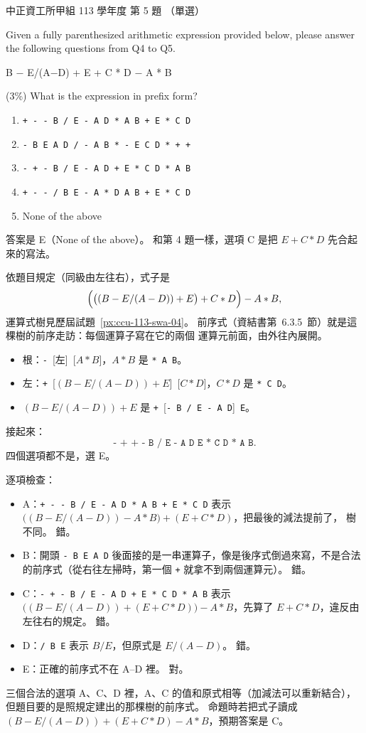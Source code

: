 \begin{pastexam}[label={px:ccu-113-swa-05}]{中正資工所甲組 113 學年度 第 5 題}
（單選）

Given a fully parenthesized arithmetic expression provided below, please answer the following questions from Q4 to Q5.
\begin{center}
B $-$ E/(A$-$D) + E + C * D $-$ A * B
\end{center}

(3\%) What is the expression in prefix form?
\begin{enumerate}[label=\Alph*.]
\item \texttt{+ - - B / E - A D * A B + E * C D}
\item \texttt{- B E A D / - A B * - E C D * + +}
\item \texttt{- + - B / E - A D + E * C D * A B}
\item \texttt{+ - - / B E - A * D A B + E * C D}
\item None of the above
\end{enumerate}
\end{pastexam}

\begin{pastsoln}
答案是 E（None of the above）。 和第 4 題一樣，選項 C 是把 $E + C * D$ 先合起來的寫法。

依題目規定（同級由左往右），式子是
\[
\Bigl( \bigl( (B - E/(A - D)) + E \bigr) + C * D \Bigr) - A * B ,
\]
運算式樹見歷屆試題~\ref{px:ccu-113-swa-04}。 前序式（資結書第~6.3.5~節）就是這棵樹的前序走訪：每個運算子寫在它的兩個
運算元前面，由外往內展開。
\begin{itemize}
\item 根：\texttt{-}\ [左]\ [$A * B$]，$A * B$ 是 \texttt{* A B}。
\item 左：\texttt{+}\ [$(B - E/(A-D)) + E$]\ [$C * D$]，$C * D$ 是 \texttt{* C D}。
\item $(B - E/(A-D)) + E$ 是 \texttt{+}\ [\texttt{- B / E - A D}]\ \texttt{E}。
\end{itemize}
接起來：
\[
\texttt{- + + - B / E - A D E * C D * A B}.
\]
四個選項都不是，選 E。

逐項檢查：
\begin{itemize}
\item A：\texttt{+ - - B / E - A D * A B + E * C D} 表示 $\bigl((B - E/(A-D)) - A * B\bigr) + (E + C * D)$，把最後的減法提前了，
樹不同。 錯。
\item B：開頭 \texttt{- B E A D} 後面接的是一串運算子，像是後序式倒過來寫，不是合法的前序式（從右往左掃時，第一個
\texttt{+} 就拿不到兩個運算元）。 錯。
\item C：\texttt{- + - B / E - A D + E * C D * A B} 表示 $\bigl((B - E/(A-D)) + (E + C * D)\bigr) - A * B$，先算了
$E + C * D$，違反由左往右的規定。 錯。
\item D：\texttt{/ B E} 表示 $B / E$，但原式是 $E / (A - D)$。 錯。
\item E：正確的前序式不在 A--D 裡。 對。
\end{itemize}
三個合法的選項 A、C、D 裡，A、C 的值和原式相等（加減法可以重新結合），但題目要的是照規定建出的那棵樹的前序式。
命題時若把式子讀成 $(B - E/(A - D)) + (E + C * D) - A * B$，預期答案是 C。
\end{pastsoln}
